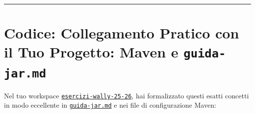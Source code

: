 \documentclass[11pt,a4paper,oneside]{report}
\newcommand{\passthrough}[1]{#1}
\begin{document}
\begin{center}\rule{0.5\linewidth}{0.5pt}\end{center}

\section{\texorpdfstring{Codice: Collegamento Pratico con il Tuo
Progetto: Maven e
\texttt{guida-jar.md}}{Codice: Collegamento Pratico con il Tuo Progetto: Maven e guida-jar.md}}\label{chap03_codice-collegamento-pratico-con-il-tuo-progetto-maven-e-guida-jar.md}

Nel tuo workspace
\href{file:///home/wally/Documenti/GitHub/Programmazione-II/25-26/esercizi-wally-25-26}{\passthrough{\lstinline!esercizi-wally-25-26!}},
hai formalizzato questi esatti concetti in modo eccellente in
\href{file:///home/wally/Documenti/GitHub/Programmazione-II/25-26/esercizi-wally-25-26/guida-jar.md}{\passthrough{\lstinline!guida-jar.md!}}
e nei file di configurazione Maven:
\end{document}
